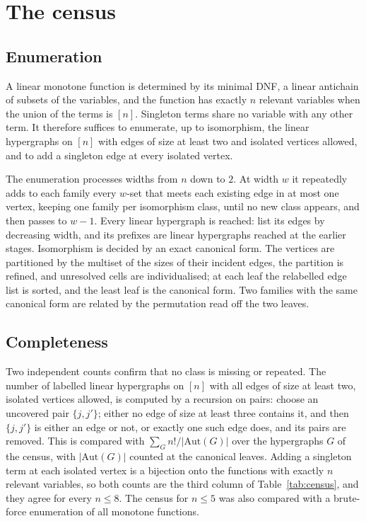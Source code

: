 \documentclass[11pt]{amsart}
\theoremstyle{remark}
\begin{document}
\section{The census}\label{sec:census}

\subsection{Enumeration}
A linear monotone function is determined by its minimal DNF, a linear antichain of subsets of the variables, and the
function has exactly $n$ relevant variables when the union of the terms is $[n]$. Singleton terms share no variable
with any other term. It therefore suffices to enumerate, up to isomorphism, the linear hypergraphs on $[n]$ with edges of
size at least two and isolated vertices allowed, and to add a singleton edge at every isolated vertex.

The enumeration processes widths from $n$ down to $2$. At width $w$ it repeatedly adds to each family every $w$-set
that meets each existing edge in at most one vertex, keeping one family per isomorphism class, until no new class
appears, and then passes to $w-1$. Every linear hypergraph is reached: list its edges by decreasing width, and its
prefixes are linear hypergraphs reached at the earlier stages. Isomorphism is decided by an exact canonical form. The
vertices are partitioned by the multiset of the sizes of their incident edges, the partition is refined, and
unresolved cells are individualised; at each leaf the relabelled edge list is sorted, and the least leaf is the
canonical form. Two families with the same canonical form are related by the permutation read off the two leaves.

\subsection{Completeness}
Two independent counts confirm that no class is missing or repeated. The number of labelled linear hypergraphs on $[n]$
with all edges of size at least two, isolated vertices allowed, is computed by a recursion on pairs: choose an uncovered pair $\{j,j'\}$; either no edge
of size at least three contains it, and then $\{j,j'\}$ is either an edge or not, or exactly one such edge does, and its
pairs are removed. This is compared with $\sum_Gn!/|\mathrm{Aut}(G)|$ over the hypergraphs $G$ of the census, with $|\mathrm{Aut}(G)|$ counted
at the canonical leaves. Adding a singleton term at each isolated vertex is a bijection onto the functions with
exactly $n$ relevant variables, so both counts are the third column of Table~\ref{tab:census}, and they agree for every
$n\le8$. The census for $n\le5$ was also compared with a brute-force enumeration of all monotone functions.
\end{document}
